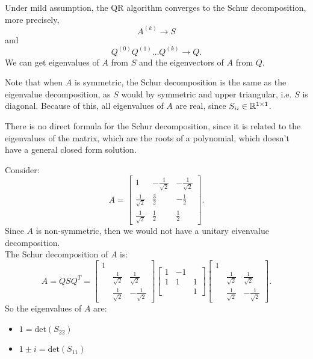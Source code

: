 \documentclass[../main/main.tex]{subfiles}
\begin{document}
\begin{theorem}
	Under mild assumption, the QR algorithm converges to the Schur decomposition, more precisely, \[
		A^{(k)}\to S
	\] and \[
	Q^{(0)}Q^{(1)}\ldots Q^{(k)}\to Q
	.\] We can get eigenvalues of $A$ from $S$ and the eigenvectors of $A$ from $Q$. 
\end{theorem}
\begin{remark}
	Note that when $A$ is symmetric, the Schur decomposition is the same as the eigenvalue decomposition, as $S$ would by symmetric and upper triangular, i.e. $S$ is diagonal. Because of this, all eigenvalues of $A$ are real, since $S_{ii}\in \mathbb{R}^{1\times 1}$.
\end{remark}
\begin{remark}
	There is no direct formula for the Schur decomposition, since it is related to the eigenvalues of the matrix, which are the roots of a polynomial, which doesn't have a general closed form solution.
\end{remark}
\begin{example}
	Consider: \[
		A=\begin{bmatrix} 1&-\frac{1}{\sqrt{2} }&-\frac{1}{\sqrt{2} } \\ \frac{1}{\sqrt{2} }&\frac{3}{2} & -\frac{1}{2} \\ \frac{1}{\sqrt{2} } &\frac{1}{2}&\frac{1}{2} \end{bmatrix} 
	.\] Since $A$ is non-symmetric, then we would not have a unitary eivenvalue decomposition.\\ 
	The Schur decomposition of $A$ is: \[
		A=QSQ^{T}=\begin{bmatrix} 1&&\\ &\frac{1}{\sqrt{2} }&\frac{1}{\sqrt{2} }\\ & \frac{1}{\sqrt{2} } & -\frac{1}{\sqrt{2} } \end{bmatrix} \begin{bmatrix} 1 & -1 &\\ 1 & 1 & 1 \\ &&1 \end{bmatrix} \begin{bmatrix} 1&&\\& \frac{1}{\sqrt{2} } &\frac{1}{\sqrt{2} } \\ & \frac{1}{\sqrt{2} } & -\frac{1}{\sqrt{2} } \end{bmatrix} 
	.\] So the eigenvalues of $A$ are: 
	\begin{itemize}
		\item $1=\text{det}(S_{22})$
		\item $1\pm i=\text{det}(S_{11})$
	\end{itemize}
\end{example}
\end{document}
